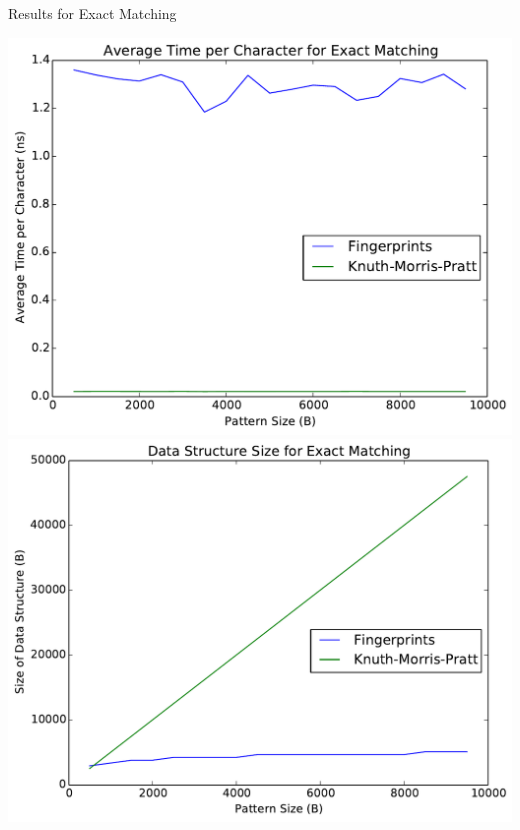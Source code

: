 \documentclass[ %
                    author={Dominic Moylett},
                supervisor={Dr. Raphael Clifford, Dr. Markus Jalsenius and Dr. Ben Sach},
                     title={An Empirical Analysis of Data Streaming Algorithms},
                  subtitle={},
                    degree={MEng},
                      year={2014} ]{poster}
\begin{document}
\begin{frame}{}
\begin{columns}[t]
  \begin{column}{0.422\linewidth}
  \begin{block}{\Large Results for Exact Matching}
  \begin{center}
  \includegraphics[scale=0.6]{exact_run_time}\includegraphics[scale=0.6]{exact_size}
  \end{center}
  \end{block}
  \end{column}
\end{columns}

\vfill


\end{frame}
\end{document}
